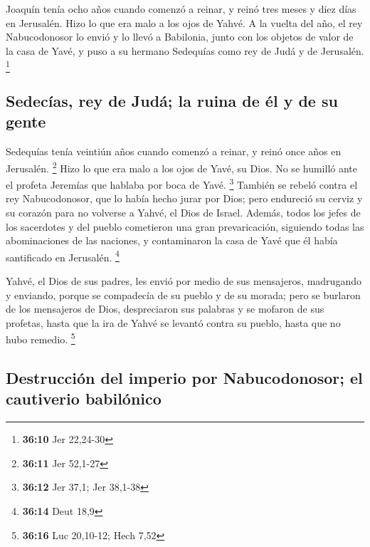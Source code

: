  Joaquín tenía ocho años cuando comenzó a reinar, y reinó
tres meses y diez días en Jerusalén. Hizo lo que era malo a los ojos de
Yahvé.  A la vuelta del año, el rey Nabucodonosor lo
envió y lo llevó a Babilonia, junto con los objetos de valor de la casa
de Yavé, y puso a su hermano Sedequías como rey de Judá y de Jerusalén.
\footnote{\textbf{36:10} Jer 22,24-30}

\hypertarget{sedecuxedas-rey-de-juduxe1-la-ruina-de-uxe9l-y-de-su-gente}{%
\subsection{Sedecías, rey de Judá; la ruina de él y de su
gente}\label{sedecuxedas-rey-de-juduxe1-la-ruina-de-uxe9l-y-de-su-gente}}

 Sedequías tenía veintiún años cuando comenzó a reinar, y
reinó once años en Jerusalén. \footnote{\textbf{36:11} Jer 52,1-27}
 Hizo lo que era malo a los ojos de Yavé, su Dios. No se
humilló ante el profeta Jeremías que hablaba por boca de Yavé.
\footnote{\textbf{36:12} Jer 37,1; Jer 38,1-38}  También
se rebeló contra el rey Nabucodonosor, que lo había hecho jurar por
Dios; pero endureció su cerviz y su corazón para no volverse a Yahvé, el
Dios de Israel.  Además, todos los jefes de los
sacerdotes y del pueblo cometieron una gran prevaricación, siguiendo
todas las abominaciones de las naciones, y contaminaron la casa de Yavé
que él había santificado en Jerusalén. \footnote{\textbf{36:14} Deut
  18,9}

 Yahvé, el Dios de sus padres, les envió por medio de sus
mensajeros, madrugando y enviando, porque se compadecía de su pueblo y
de su morada;  pero se burlaron de los mensajeros de
Dios, despreciaron sus palabras y se mofaron de sus profetas, hasta que
la ira de Yahvé se levantó contra su pueblo, hasta que no hubo remedio.
\footnote{\textbf{36:16} Luc 20,10-12; Hech 7,52}

\hypertarget{destrucciuxf3n-del-imperio-por-nabucodonosor-el-cautiverio-babiluxf3nico}{%
\subsection{Destrucción del imperio por Nabucodonosor; el cautiverio
babilónico}\label{destrucciuxf3n-del-imperio-por-nabucodonosor-el-cautiverio-babiluxf3nico}}

